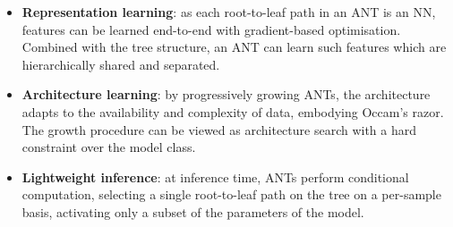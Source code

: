 \begin{itemize}
	\item \textbf{Representation learning}: as each root-to-leaf path in an ANT is an NN, features can be learned end-to-end with gradient-based optimisation. Combined with the tree structure, an ANT can learn such features which are hierarchically shared and separated. %
	
	\item \textbf{Architecture learning}: by progressively growing ANTs, the architecture adapts to the availability and complexity of data, embodying Occam’s razor. %
	The growth procedure can be viewed as architecture search with a hard constraint over the model class.
    \item \textbf{Lightweight inference}: at inference time, ANTs perform conditional computation, selecting a single root-to-leaf path on the tree on a per-sample basis, activating only a subset of the parameters of the model. 
\end{itemize}

